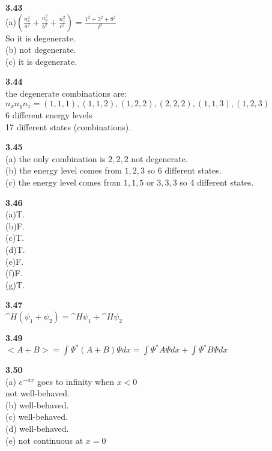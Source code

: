 \documentclass{article}
\begin{document}
\textbf{3.43}\\
(a)$(\frac{n_x^2}{a^2}+\frac{n_y^2}{b^2}+\frac{n_z^2}{c^2}) = \frac{1^2+3^2+8^2}{l^2}$\\
So it is degenerate.\\
(b) not degenerate.\\
(c) it is degenerate.\\
\newline

\textbf{3.44}\\
the degenerate combinations are:\\
$n_xn_yn_z = (1,1,1), (1,1,2), (1,2,2), (2,2,2), (1,1,3), (1,2,3)$\\
6 different energy levels\\
17 different states (combinations).\\
\newline

\textbf{3.45}\\
(a) the only combination is $2,2,2$ not degenerate.\\
(b) the energy level comes from $1,2,3$ so 6 different states.\\
(c) the energy level comes from $1,1,5$ or $3,3,3$ so 4 different states.\\
\newline

\textbf{3.46}\\
(a)T.\\
(b)F.\\
(c)T.\\
(d)T.\\
(e)F.\\
(f)F.\\
(g)T.\\
\newline

\textbf{3.47}\\
$\^{H}(\psi_1+\psi_2) = \^{H}\psi_1+\^{H}\psi_2$\\
\newline

\textbf{3.49}\\
$<A+B> = \int\Psi^*(A+B)\Psi dx = \int\Psi^*A\Psi dx + \int\Psi^*B\Psi dx$\\
\newline

\textbf{3.50}\\
(a) $e^{-ax}$ goes to infinity when $x<0$\\
not well-behaved.\\
(b) well-behaved.\\
(c) well-behaved.\\
(d) well-behaved.\\
(e) not continuous at $x = 0$\\
\newline
\end{document}
